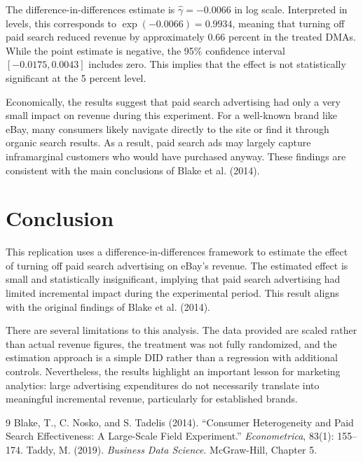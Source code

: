 \documentclass[12pt]{article}
\begin{document}


The difference-in-differences estimate is $\hat{\gamma} = -0.0066$ in log scale. Interpreted in levels, this corresponds to $\exp(-0.0066) = 0.9934$, meaning that turning off paid search reduced revenue by approximately 0.66 percent in the treated DMAs. While the point estimate is negative, the 95\% confidence interval $[-0.0175, 0.0043]$ includes zero. This implies that the effect is not statistically significant at the 5 percent level.

Economically, the results suggest that paid search advertising had only a very small impact on revenue during this experiment. For a well-known brand like eBay, many consumers likely navigate directly to the site or find it through organic search results. As a result, paid search ads may largely capture inframarginal customers who would have purchased anyway. These findings are consistent with the main conclusions of Blake et al. (2014).


\section{Conclusion}

This replication uses a difference-in-differences framework to estimate the effect of turning off paid search advertising on eBay’s revenue. The estimated effect is small and statistically insignificant, implying that paid search advertising had limited incremental impact during the experimental period. This result aligns with the original findings of Blake et al. (2014).

There are several limitations to this analysis. The data provided are scaled rather than actual revenue figures, the treatment was not fully randomized, and the estimation approach is a simple DID rather than a regression with additional controls. Nevertheless, the results highlight an important lesson for marketing analytics: large advertising expenditures do not necessarily translate into meaningful incremental revenue, particularly for established brands.

\begin{thebibliography}{9}
Blake, T., C. Nosko, and S. Tadelis (2014).
``Consumer Heterogeneity and Paid Search Effectiveness: A Large-Scale Field Experiment.''
\textit{Econometrica}, 83(1): 155--174.
Taddy, M. (2019).
\textit{Business Data Science}. McGraw-Hill, Chapter 5.
\end{thebibliography}
\end{document}
